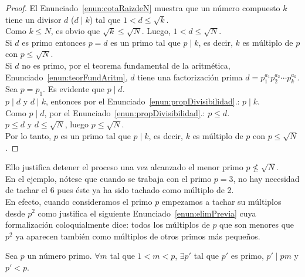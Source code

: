 \begin{proof}
El Enunciado~\ref{enun:cotaRaizdeN} muestra que un número compuesto $k$ tiene un divisor $d$ ($d \mid k$) tal que $1 < d \leq \sqrt{k}$. \\
Como $k \leq N$, es obvio que $\sqrt{k} \leq \sqrt{N}$.
Luego, $1 < d \leq \sqrt{N}$. \\
Si $d$ es primo entonces $p = d$ es un primo tal que $p \mid k$, es decir, $k$ es múltiplo de $p$ con $p \leq \sqrt{N}$. \\
Si $d$ no es primo, por el teorema fundamental de la aritmética, Enunciado~\ref{enun:teorFundAritm}, $d$ tiene una  factorización prima $d = p_1^{a_1} p_2^{a_2} \cdots p_k^{a_k}$. \\
Sea $p = p_1$. Es evidente que $p \mid d$. \\
$p \mid d$ y $d \mid k$, \setcounter{enumi}{5} entonces por el Enunciado~\ref{enun:propDivisibilidad}.: $p \mid k$. \\
Como $p \mid d$, \setcounter{enumi}{2} por el Enunciado~\ref{enun:propDivisibilidad}.: $p \leq d$. \\
$p \leq d$ y $d \leq \sqrt{N}$, luego $p \leq \sqrt{N}$. \\
Por lo tanto, $p$ es un primo tal que $p \mid k$, es decir, $k$ es múltiplo de $p$ con $p \leq \sqrt{N}$.
\end{proof}

Ello justifica detener el proceso una vez alcanzado el menor primo $p \nleq \sqrt{N}$. \\
En el ejemplo, nótese que cuando se trabaja con el primo $p = 3$, no hay necesidad de tachar el 6 pues éste ya ha sido tachado como múltiplo de 2. \\
En efecto, cuando consideramos el primo $p$ empezamos a tachar su múltiplos desde $p^{2}$ como justifica el siguiente Enunciado~\ref{enun:elimPrevia} cuya formalización coloquialmente dice: todos los múltiplos de $p$ que son menores que $p^{2}$ ya aparecen también como múltiplos de otros primos más pequeños.

\begin{enunciado} \label{enun:elimPrevia}\leavevmode\par Sea $p$ un número primo. $\forall m$ tal que $1 < m < p$, $\exists p'$ tal que $p'$ es primo, $p' \mid pm$ y $p' < p$.
\end{enunciado}

